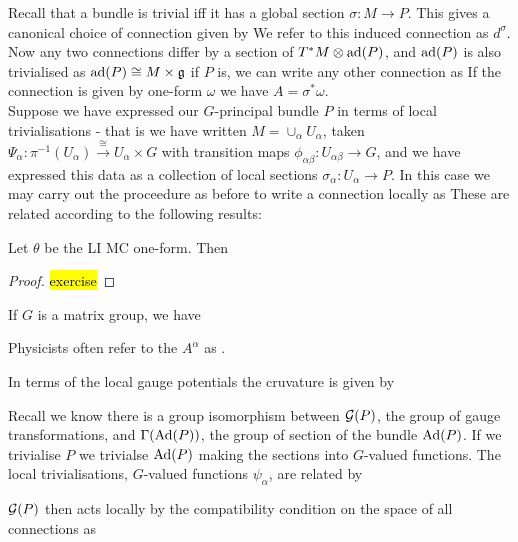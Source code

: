 \documentclass{article}
\begin{document}
Recall that a bundle is trivial iff it has a global section $\sigma : M \to P$. This gives a canonical choice of connection given by 
We refer to this induced connection as $d^\sigma$. \\
Now any two connections differ by a section of $T^\ast M \otimes \operatorname{ad}(P)$, and $\operatorname{ad}(P)$ is also trivialised as $\operatorname{ad}(P) \cong M \times \mathfrak{g}$ if $P$ is, we can write any other connection as 
If the connection is given by one-form $\omega$ we have $A = \sigma^\ast \omega$. \\
Suppose we have expressed our $G$-principal bundle $P$ in terms of local trivialisations - that is we have written $M = \cup_\alpha U_\alpha$, taken $\Psi_\alpha : \pi^{-1}(U_\alpha) \overset{\cong}{\to} U_\alpha \times G$ with transition maps $\phi_{\alpha\beta}:U_{\alpha\beta} \to G$, and we have expressed this data as a collection of local sections $\sigma_\alpha : U_\alpha \to P$. In this case we may carry out the proceedure as before to write a connection locally as 
These are related according to the following results:
\begin{theorem}
	Let $\theta$ be the LI MC one-form. Then 
\end{theorem}
\begin{proof}
\hl{exercise}
\end{proof}

\begin{corollary}
	If $G$ is a matrix group, we have 
\end{corollary}

\begin{remark}
	Physicists often refer to the $A^\alpha$ as . 
\end{remark}

\begin{prop}
	In terms of the local gauge potentials the cruvature is given by 
\end{prop}


Recall we know there is a group isomorphism between $\mathcal{G}(P)$, the group of gauge transformations, and $\Gamma(\operatorname{Ad}(P))$, the group of section of the bundle $\operatorname{Ad}(P)$. If we trivialise $P$ we trivialse $\operatorname{Ad}(P)$ making the sections into $G$-valued functions. The local trivialisations, $G$-valued functions $\psi_\alpha$, are related by 
\begin{prop}
$\mathcal{G}(P)$ then acts locally by the compatibility condition on the space of all connections as 
\end{prop}
\end{document}
